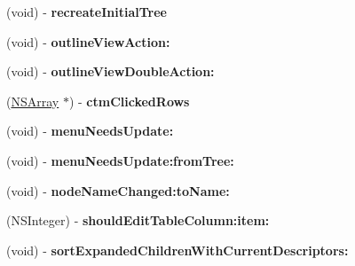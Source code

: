 \begin{DoxyCompactItemize}
\item 
\hypertarget{interface_tree_controller_data_source_ae248627d81b68d36f9aee276e9f36927}{
(void) -\/ {\bfseries recreateInitialTree}}
\label{interface_tree_controller_data_source_ae248627d81b68d36f9aee276e9f36927}

\item 
\hypertarget{interface_tree_controller_data_source_ab651f39b51aac499b8e8e2588f8cbbec}{
(void) -\/ {\bfseries outlineViewAction:}}
\label{interface_tree_controller_data_source_ab651f39b51aac499b8e8e2588f8cbbec}

\item 
\hypertarget{interface_tree_controller_data_source_ac8590cae3c725853cb5b84f016550172}{
(void) -\/ {\bfseries outlineViewDoubleAction:}}
\label{interface_tree_controller_data_source_ac8590cae3c725853cb5b84f016550172}

\item 
\hypertarget{interface_tree_controller_data_source_aeb58d9232e541d8638a3e327e6bdbd43}{
(\hyperlink{class_n_s_array}{NSArray} $\ast$) -\/ {\bfseries ctmClickedRows}}
\label{interface_tree_controller_data_source_aeb58d9232e541d8638a3e327e6bdbd43}

\item 
\hypertarget{interface_tree_controller_data_source_ac793ee232dbb7706129ce8e6220c8d8f}{
(void) -\/ {\bfseries menuNeedsUpdate:}}
\label{interface_tree_controller_data_source_ac793ee232dbb7706129ce8e6220c8d8f}

\item 
\hypertarget{interface_tree_controller_data_source_af2d3bb28c4c07a93665187ffeb222b03}{
(void) -\/ {\bfseries menuNeedsUpdate:fromTree:}}
\label{interface_tree_controller_data_source_af2d3bb28c4c07a93665187ffeb222b03}

\item 
\hypertarget{interface_tree_controller_data_source_afa8b8e1ee4f6e9c8736603a74de10c69}{
(void) -\/ {\bfseries nodeNameChanged:toName:}}
\label{interface_tree_controller_data_source_afa8b8e1ee4f6e9c8736603a74de10c69}

\item 
\hypertarget{interface_tree_controller_data_source_a94acab01dfb5ac79570bc45cdc2f7e9d}{
(NSInteger) -\/ {\bfseries shouldEditTableColumn:item:}}
\label{interface_tree_controller_data_source_a94acab01dfb5ac79570bc45cdc2f7e9d}

\item 
\hypertarget{interface_tree_controller_data_source_a69132750d9bf8444af9b5a61f5866518}{
(void) -\/ {\bfseries sortExpandedChildrenWithCurrentDescriptors:}}
\label{interface_tree_controller_data_source_a69132750d9bf8444af9b5a61f5866518}


\end{DoxyCompactItemize}
